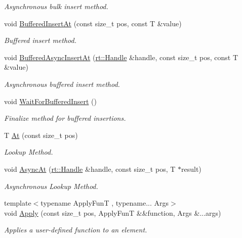 \begin{DoxyCompactItemize}
\begin{DoxyCompactList}\small\item\em Asynchronous bulk insert method. \end{DoxyCompactList}\item 
void \hyperlink{classshad_1_1Array_ac684b1894e474db3e9fee060a1bd59bf}{Buffered\-Insert\-At} (const size\-\_\-t pos, const T \&value)
\begin{DoxyCompactList}\small\item\em Buffered insert method. \end{DoxyCompactList}\item 
void \hyperlink{classshad_1_1Array_a34c463d858d31e8090534405c7692580}{Buffered\-Async\-Insert\-At} (\hyperlink{classshad_1_1rt_1_1Handle}{rt\-::\-Handle} \&handle, const size\-\_\-t pos, const T \&value)
\begin{DoxyCompactList}\small\item\em Asynchronous buffered insert method. \end{DoxyCompactList}\item 
void \hyperlink{classshad_1_1Array_a80bdbc75aca1424f086305d9297dccec}{Wait\-For\-Buffered\-Insert} ()
\begin{DoxyCompactList}\small\item\em Finalize method for buffered insertions. \end{DoxyCompactList}\item 
T \hyperlink{classshad_1_1Array_a56085a958b519c523540a5e8babb8045}{At} (const size\-\_\-t pos)
\begin{DoxyCompactList}\small\item\em Lookup Method. \end{DoxyCompactList}\item 
void \hyperlink{classshad_1_1Array_a23fe4840cee746b5f54c118650139ed0}{Async\-At} (\hyperlink{classshad_1_1rt_1_1Handle}{rt\-::\-Handle} \&handle, const size\-\_\-t pos, T $\ast$result)
\begin{DoxyCompactList}\small\item\em Asynchronous Lookup Method. \end{DoxyCompactList}\item 
{\footnotesize template$<$typename Apply\-Fun\-T , typename... Args$>$ }\\void \hyperlink{classshad_1_1Array_a044795e62744280d74a0fc8933dc5b6c}{Apply} (const size\-\_\-t pos, Apply\-Fun\-T \&\&function, Args \&...args)
\begin{DoxyCompactList}\small\item\em Applies a user-\/defined function to an element. \end{DoxyCompactList}\item 

\end{DoxyCompactItemize}
